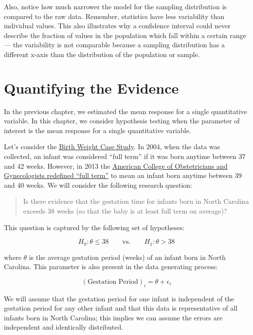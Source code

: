 \documentclass[
]{book}
\theoremstyle{plain}
\theoremstyle{mydefn}
\theoremstyle{myexmpl}
\theoremstyle{remark}
\begin{document}
Also, notice how much narrower the model for the sampling distribution is compared to the raw data. Remember, statistics have less variability than individual values. This also illustrates why a confidence interval could never describe the fraction of values in the population which fall within a certain range --- the variability is not comparable because a sampling distribution has a different x-axis than the distribution of the population or sample.

\hypertarget{SingleTeststat}{%
\chapter{Quantifying the Evidence}\label{SingleTeststat}}

In the previous chapter, we estimated the mean response for a single quantitative variable. In this chapter, we consider hypothesis testing when the parameter of interest is the mean response for a single quantitative variable.

Let's consider the \protect\hyperlink{CaseBabies}{Birth Weight Case Study}. In 2004, when the data was collected, an infant was considered ``full term'' if it was born anytime between 37 and 42 weeks. However, in 2013 the \href{https://journals.lww.com/greenjournal/Fulltext/2013/11000/Committee_Opinion_No_579___Definition_of_Term.39.aspx}{American College of Obstetricians and Gynecologists redefined ``full term''} to mean an infant born anytime between 39 and 40 weeks. We will consider the following research question:

\begin{quote}
Is there evidence that the gestation time for infants born in North Carolina exceeds 38 weeks (so that the baby is at least full term on average)?
\end{quote}

This question is captured by the following set of hypotheses:

\[H_0: \theta \leq 38 \qquad \text{vs.} \qquad H_1: \theta > 38\]

where \(\theta\) is the average gestation period (weeks) of an infant born in North Carolina. This parameter is also present in the data generating process:

\[(\text{Gestation Period})_i = \theta + \epsilon_i\]

We will assume that the gestation period for one infant is independent of the gestation period for any other infant and that this data is representative of all infants born in North Carolina; this implies we can assume the errors are independent and identically distributed.
\end{document}
